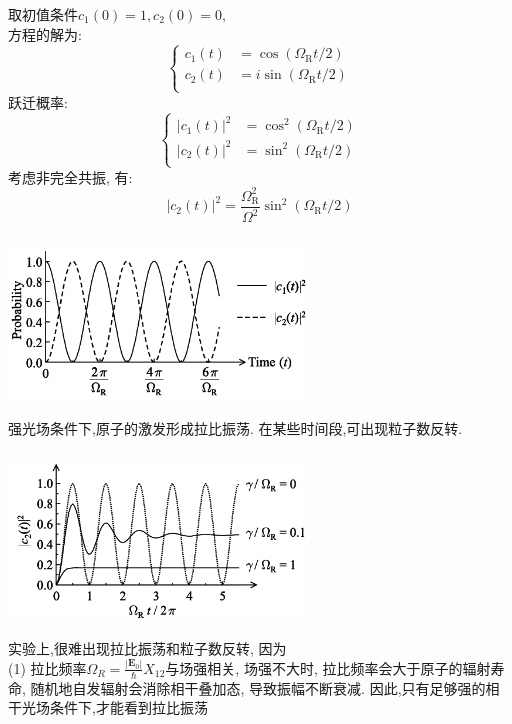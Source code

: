     \begin{frame} 
    \frametitle{}
         取初值条件$c_1(0)=1, c_2(0)=0$, \\ 
         方程的解为:
         \[ \begin{cases}
            c_1(t)&=\cos(\Omega_{\mathrm{R}} t /2)\\ 
            c_2(t)&=i\sin(\Omega_{\mathrm{R}} t /2)\\ 
         \end{cases} \]
        跃迁概率:
         \[ \begin{cases}
            |c_1(t)|^2&=\cos^2(\Omega_{\mathrm{R}} t /2)\\ 
            |c_2(t)|^2&=\sin^2(\Omega_{\mathrm{R}} t /2)\\ 
         \end{cases} \]
         考虑非完全共振, 有:
         \[|c_2(t)|^2=\frac{\Omega^2 _{\mathrm{R}}}{\Omega ^ 2}\sin^2(\Omega_{\mathrm{R}} t /2)\]
    \end{frame}

    \begin{frame} 
    \frametitle{}
          \begin{center}
               \includegraphics[width=0.6\textwidth]{figs/2022-05-22-12-48-32.png}
          \end{center} 
        强光场条件下,原子的激发形成拉比振荡. 在某些时间段,可出现粒子数反转. \\ 
\end{frame}

\begin{frame} 
\frametitle{}
\begin{center}
    \includegraphics[width=0.6\textwidth]{figs/2022-05-22-13-14-30.png}
\end{center} 
        实验上,很难出现拉比振荡和粒子数反转, 因为\\ 
        (1) 拉比频率$\Omega_R = \frac{\left|\mathbf{E}_0\right|}{\hbar} X_{12}$与场强相关, 场强不大时, 拉比频率会大于原子的辐射寿命, 随机地自发辐射会消除相干叠加态, 导致振幅不断衰减. 因此,只有足够强的相干光场条件下,才能看到拉比振荡
    \end{frame}

